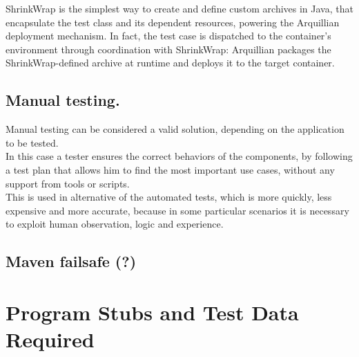 \documentclass[18pt,oneside,a4paper, titlepage]{article}
\begin{document}
		
	\vspace{0.5cm}
		
	ShrinkWrap is the simplest way to create and define custom archives in Java, that encapsulate the test class and its dependent resources, powering the Arquillian deployment mechanism. In fact, the test case is dispatched to the container's environment through coordination with ShrinkWrap: Arquillian packages the ShrinkWrap-defined archive at runtime and deploys it to the target container.
		
	\subsection{Manual testing.} Manual testing can be considered a valid solution, depending on the application to be tested.\\ In this case a tester ensures the correct behaviors of the components, by following a test plan that allows him to find the most important use cases, without any support from tools or scripts.\\ This is used in alternative of the automated tests, which is more quickly, less expensive and more accurate, because in some particular scenarios it is necessary to exploit human observation, logic and experience.
	\subsection{Maven failsafe (?)}

\newpage
\section{Program	Stubs	and	Test	Data	Required}
\end{document}

